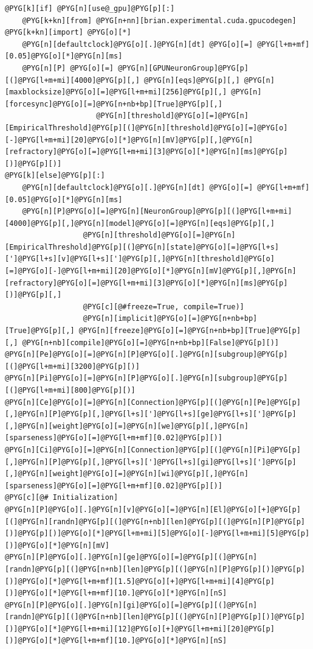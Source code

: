 \documentclass[letterpaper,10pt,english]{manual}
\begin{document}
\begin{Verbatim}[commandchars=@\[\]]
@PYG[k][if] @PYG[n][use@_gpu]@PYG[p][:]
    @PYG[k+kn][from] @PYG[n+nn][brian.experimental.cuda.gpucodegen] @PYG[k+kn][import] @PYG[o][*]
    @PYG[n][defaultclock]@PYG[o][.]@PYG[n][dt] @PYG[o][=] @PYG[l+m+mf][0.05]@PYG[o][*]@PYG[n][ms]
    @PYG[n][P] @PYG[o][=] @PYG[n][GPUNeuronGroup]@PYG[p][(]@PYG[l+m+mi][4000]@PYG[p][,] @PYG[n][eqs]@PYG[p][,] @PYG[n][maxblocksize]@PYG[o][=]@PYG[l+m+mi][256]@PYG[p][,] @PYG[n][forcesync]@PYG[o][=]@PYG[n+nb+bp][True]@PYG[p][,]
                     @PYG[n][threshold]@PYG[o][=]@PYG[n][EmpiricalThreshold]@PYG[p][(]@PYG[n][threshold]@PYG[o][=]@PYG[o][-]@PYG[l+m+mi][20]@PYG[o][*]@PYG[n][mV]@PYG[p][,]@PYG[n][refractory]@PYG[o][=]@PYG[l+m+mi][3]@PYG[o][*]@PYG[n][ms]@PYG[p][)]@PYG[p][)]
@PYG[k][else]@PYG[p][:]
    @PYG[n][defaultclock]@PYG[o][.]@PYG[n][dt] @PYG[o][=] @PYG[l+m+mf][0.05]@PYG[o][*]@PYG[n][ms]
    @PYG[n][P]@PYG[o][=]@PYG[n][NeuronGroup]@PYG[p][(]@PYG[l+m+mi][4000]@PYG[p][,]@PYG[n][model]@PYG[o][=]@PYG[n][eqs]@PYG[p][,]
                  @PYG[n][threshold]@PYG[o][=]@PYG[n][EmpiricalThreshold]@PYG[p][(]@PYG[n][state]@PYG[o][=]@PYG[l+s][']@PYG[l+s][v]@PYG[l+s][']@PYG[p][,]@PYG[n][threshold]@PYG[o][=]@PYG[o][-]@PYG[l+m+mi][20]@PYG[o][*]@PYG[n][mV]@PYG[p][,]@PYG[n][refractory]@PYG[o][=]@PYG[l+m+mi][3]@PYG[o][*]@PYG[n][ms]@PYG[p][)]@PYG[p][,]
                  @PYG[c][@#freeze=True, compile=True)]
                  @PYG[n][implicit]@PYG[o][=]@PYG[n+nb+bp][True]@PYG[p][,] @PYG[n][freeze]@PYG[o][=]@PYG[n+nb+bp][True]@PYG[p][,] @PYG[n+nb][compile]@PYG[o][=]@PYG[n+nb+bp][False]@PYG[p][)]
@PYG[n][Pe]@PYG[o][=]@PYG[n][P]@PYG[o][.]@PYG[n][subgroup]@PYG[p][(]@PYG[l+m+mi][3200]@PYG[p][)]
@PYG[n][Pi]@PYG[o][=]@PYG[n][P]@PYG[o][.]@PYG[n][subgroup]@PYG[p][(]@PYG[l+m+mi][800]@PYG[p][)]
@PYG[n][Ce]@PYG[o][=]@PYG[n][Connection]@PYG[p][(]@PYG[n][Pe]@PYG[p][,]@PYG[n][P]@PYG[p][,]@PYG[l+s][']@PYG[l+s][ge]@PYG[l+s][']@PYG[p][,]@PYG[n][weight]@PYG[o][=]@PYG[n][we]@PYG[p][,]@PYG[n][sparseness]@PYG[o][=]@PYG[l+m+mf][0.02]@PYG[p][)]
@PYG[n][Ci]@PYG[o][=]@PYG[n][Connection]@PYG[p][(]@PYG[n][Pi]@PYG[p][,]@PYG[n][P]@PYG[p][,]@PYG[l+s][']@PYG[l+s][gi]@PYG[l+s][']@PYG[p][,]@PYG[n][weight]@PYG[o][=]@PYG[n][wi]@PYG[p][,]@PYG[n][sparseness]@PYG[o][=]@PYG[l+m+mf][0.02]@PYG[p][)]
@PYG[c][@# Initialization]
@PYG[n][P]@PYG[o][.]@PYG[n][v]@PYG[o][=]@PYG[n][El]@PYG[o][+]@PYG[p][(]@PYG[n][randn]@PYG[p][(]@PYG[n+nb][len]@PYG[p][(]@PYG[n][P]@PYG[p][)]@PYG[p][)]@PYG[o][*]@PYG[l+m+mi][5]@PYG[o][-]@PYG[l+m+mi][5]@PYG[p][)]@PYG[o][*]@PYG[n][mV]
@PYG[n][P]@PYG[o][.]@PYG[n][ge]@PYG[o][=]@PYG[p][(]@PYG[n][randn]@PYG[p][(]@PYG[n+nb][len]@PYG[p][(]@PYG[n][P]@PYG[p][)]@PYG[p][)]@PYG[o][*]@PYG[l+m+mf][1.5]@PYG[o][+]@PYG[l+m+mi][4]@PYG[p][)]@PYG[o][*]@PYG[l+m+mf][10.]@PYG[o][*]@PYG[n][nS]
@PYG[n][P]@PYG[o][.]@PYG[n][gi]@PYG[o][=]@PYG[p][(]@PYG[n][randn]@PYG[p][(]@PYG[n+nb][len]@PYG[p][(]@PYG[n][P]@PYG[p][)]@PYG[p][)]@PYG[o][*]@PYG[l+m+mi][12]@PYG[o][+]@PYG[l+m+mi][20]@PYG[p][)]@PYG[o][*]@PYG[l+m+mf][10.]@PYG[o][*]@PYG[n][nS]


\end{Verbatim}
\end{document}
